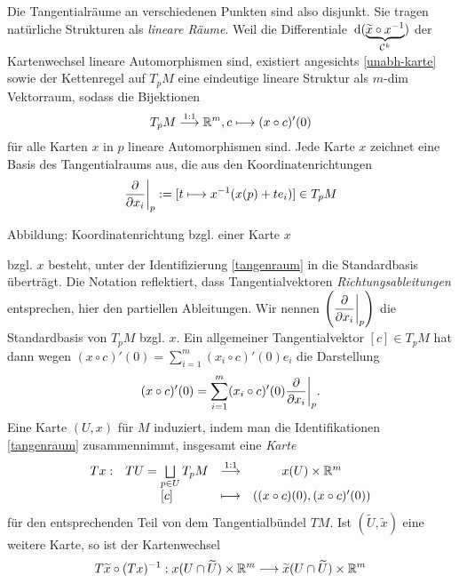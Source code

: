 Die Tangentialräume an verschiedenen Punkten sind also disjunkt. Sie tragen natürliche Strukturen als \emph{lineare Räume}. Weil die Differentiale $\, \mathrm{d}(\underbrace{\widetilde{x}\circ x^{-1}}_{\mathcal{C}^k})$ der Kartenwechsel lineare Automorphismen sind, existiert angesichts \eqref{unabh-karte} sowie der Kettenregel auf $T_pM$ eine eindeutige lineare Struktur als $m$-dim Vektorraum, sodass die Bijektionen
\begin{equation}\label{tangenraum}
T_pM\overset{1:1}\longrightarrow \mathbb{R}^m, c\longmapsto (x\circ c)'(0)
\end{equation}
für alle Karten $x$ in $p$ lineare Automorphismen sind. Jede Karte $x$ zeichnet eine Basis des Tangentialraums aus, die aus den Koordinatenrichtungen
$$\frac{\partial}{\partial x_i}\bigg|_p := [ t\longmapsto x^{-1}(x(p)+te_i)] \in T_pM$$
\begin{center}

\begin{small}
Abbildung: Koordinatenrichtung bzgl. einer Karte $x$
\end{small}
\end{center}
bzgl. $x$ besteht, unter der Identifizierung \eqref{tangenraum} in die Standardbasis überträgt. Die Notation reflektiert, dass Tangentialvektoren \emph{Richtungsableitungen} entsprechen, hier den partiellen Ableitungen. Wir nennen $\left(\dfrac{\partial}{\partial x_i}\bigg|_p\right)$ die Standardbasis von $T_pM$ bzgl. $x$. Ein allgemeiner Tangentialvektor $[c]\in T_pM$ hat dann wegen
$(x\circ c)'(0)=\sum_{i=1}^m(x_i\circ c)'(0)e_i$
die Darstellung
\begin{equation}\label{darstellung-tanvek}
(x\circ c)'(0)=\sum_{i=1}^m(x_i\circ c)'(0)\frac{\partial}{\partial x_i}\bigg|_p.
\end{equation}
Eine Karte $(U,x)$ für $M$ induziert, indem man die Identifikationen \eqref{tangenraum} zusammennimmt, insgesamt eine \emph{Karte} 
\begin{equation}\label{karte-von-tanb}
\begin{array}{cccc}
Tx:&TU=\bigsqcup\limits_{p\in U}T_pM &\overset{1:1}\longrightarrow &x(U)\times \mathbb{R}^m\\
& [c]&\longmapsto& ((x\circ c)(0),(x\circ c)'(0))
\end{array}
\end{equation}
für den entsprechenden Teil von dem Tangentialbündel $TM$. Ist $(\widetilde{U},\widetilde{x})$ eine weitere Karte, so ist der Kartenwechsel
\begin{equation}\label{kartenwechsel-tanb}
T\widetilde{x}\circ(Tx)^{-1}:x(U\cap \widetilde{U})\times \mathbb{R}^m \longrightarrow \widetilde{x} (U\cap \widetilde{U}) \times \mathbb{R}^m
\end{equation}
